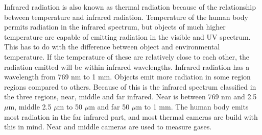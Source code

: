 Infrared radiation is also known as thermal radiation because of the relationship between temperature and infrared radiation. Temperature of the human body permits radiation in the infrared spectrum, but objects of much higher temperature are capable of emitting radiation in the visible and UV spectrum. This has to do with the difference between object and environmental temperature. If the temperature of these are relatively close to each other, the radiation emitted will be within infrared wavelengths. Infrared radiation has a wavelength from 769 nm to 1 mm. Objects emit more radiation in some region regions compared to others. Because of this is the infrared spectrum classified in the three regions, near, middle and far infrared. Near is between 769 nm and 2.5 $\mu$m, middle 2.5 $\mu$m to 50 $\mu$m and far 50 $\mu$m to 1 mm. The human body emits most radiation in the far infrared part, and most thermal cameras are build with this in mind. Near and middle cameras are used to measure gases.\cite{ignacio2017} 




%
%
%
%
%
%
%
%




